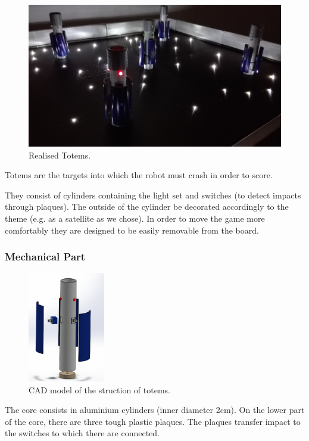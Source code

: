 \documentclass[a4paper,twoside]{book}
\begin{document}
\begin{figure}[h]
\includegraphics[width=\linewidth]{img/IMG_20160616_111854} 
\caption{Realised Totems.}
\end{figure}

Totems are the targets into which the robot must crash in order to score.

They consist of cylinders containing the light set and switches (to detect impacts through plaques). The outside of the cylinder be decorated accordingly to the theme (e.g. as a satellite as we chose). In order to move the game more comfortably they are designed to be easily removable from the board.

\subsubsection{Mechanical Part}

\begin{figure} 
    \centering
    \includegraphics[width=0.3\textwidth]{img/totem_nuovo1}
    \caption{CAD model of the struction of totems.}
\end{figure}

The core consists in aluminium cylinders (inner diameter 2cm). On the lower part of the core, there are three tough plastic plaques. The plaques transfer impact to the switches to which there are connected.
\end{document}
